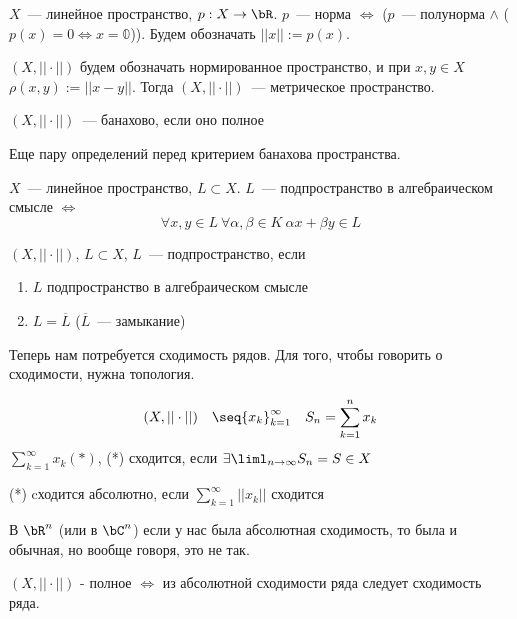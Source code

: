 \documentclass[document]{subfiles}
\begin{document}
\begin{definition}[Норма]
    $X$~--- линейное пространство, $p : X \rightarrow \bR$. $p$~--- норма $\Leftrightarrow $ ($p$~--- полунорма $\land $ ($p(x) = 0 \Leftrightarrow x = \mathbb{0}$)).
    Будем обозначать $||x|| := p(x)$.
\end{definition}
$(X, || \cdot ||)$ будем обозначать нормированное пространство, и при $x, y \in X \:$ $\rho(x,y) := ||x-y||$. Тогда $(X,||\cdot ||)$~--- метрическое пространство.

\begin{definition}
    $(X, || \cdot ||)$~--- банахово, если оно полное
\end{definition}
Еще пару определений перед критерием банахова пространства.

\begin{definition}
    $X$~--- линейное пространство, $L \subset X$. $L$~--- подпространство в алгебраическом смысле $\Leftrightarrow$ 
    \[\forall x, y \in L \: \forall \alpha, \beta \in K \: \alpha x + \beta y \in L \]
\end{definition}

\begin{definition}[подпространство]
    $(X, || \cdot ||)$, $L \subset X$, $L$~--- подпространство, если
    \begin{enumerate}
        \item $L$ подпространство в алгебраическом смысле
        \item $L = \overline{L}$ ($\overline{L}$~--- замыкание)
    \end{enumerate}
\end{definition}

Теперь нам потребуется сходимость рядов. Для того, чтобы говорить о сходимости, нужна топология.

\begin{definition}[Cходимость]
    \[(X, || \cdot ||) \quad \seq{x_k}^\infty_{k=1} \quad S_n = \sum^n_{k=1} x_k \]
    $\sum_{k=1}^\infty x_k (*)$,  
    (*) сходится, если $\exists \liml_{n \to \infty}{S_n} = S \in X$

    (*) cходится абсолютно, если $\sum^\infty_{k=1} ||x_k||$ сходится
\end{definition}
В $\bR^n$ (или в $\bC^n$) если у нас была абсолютная сходимость, то была и обычная, но вообще говоря, это не так.

\begin{theorem}
    $(X, || \cdot||)$ - полное $\Leftrightarrow$ из абсолютной сходимости ряда следует сходимость ряда.
\end{theorem}
\end{document}
